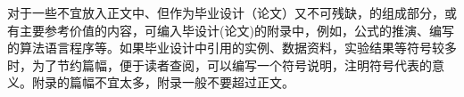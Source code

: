 \neepuappendix
\bodystyle
对于一些不宜放入正文中、但作为毕业设计（论文）又不可残缺，的组成部分，或有主要参考价值的内容，可编入毕设计(论文)的附录中，例如，公式的推演、编写的算法语言程序等。如果毕业设计中引用的实例、数据资料，实验结果等符号较多时，为了节约篇幅，便于读者查阅，可以编写一个符号说明，注明符号代表的意义。附录的篇幅不宜太多，附录一般不要超过正文。\par